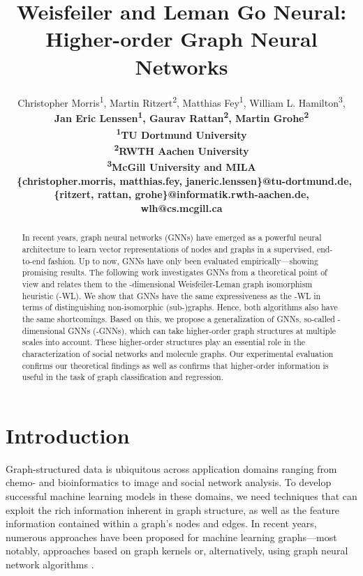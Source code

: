 \documentclass[letterpaper]{article}
\theoremstyle{definition}
\begin{document}
\title{Weisfeiler and Leman Go Neural: Higher-order Graph Neural Networks}
\author{
	Christopher Morris\textsuperscript{1},
	Martin Ritzert\textsuperscript{2},
	Matthias Fey\textsuperscript{1},
	William L. Hamilton\textsuperscript{3},\\\bf \Large
	Jan Eric Lenssen\textsuperscript{1},
	Gaurav Rattan\textsuperscript{2},
	Martin Grohe\textsuperscript{2}\\
	\textsuperscript{1}{TU Dortmund University}\\
	\textsuperscript{2}{RWTH Aachen University}\\
	\textsuperscript{3}{McGill University and MILA}\\\
	\{christopher.morris, matthias.fey, janeric.lenssen\}@tu-dortmund.de,\\
	\{ritzert, rattan, grohe\}@informatik.rwth-aachen.de,\\
	wlh@cs.mcgill.ca
}

\maketitle 

\begin{abstract}
	In recent years, graph neural networks (GNNs) have emerged as a powerful neural architecture to learn vector representations of nodes and graphs in a supervised, end-to-end fashion. Up to now, GNNs have only been evaluated empirically---showing promising results. The following work investigates GNNs from a theoretical point of view and relates them to the -dimensional Weisfeiler-Leman graph isomorphism heuristic (-WL). We show that GNNs have the same expressiveness as the -WL in terms of distinguishing non-isomorphic (sub-)graphs. Hence, both algorithms also have the same shortcomings. Based on this, we propose a generalization of GNNs, so-called -dimensional GNNs (-GNNs), which can take higher-order graph structures at multiple scales into account. These higher-order structures play an essential role in the characterization of social networks and molecule graphs. Our experimental evaluation confirms our theoretical findings as well as confirms that higher-order information is useful in the task of graph classification and regression.
\end{abstract}



\section{Introduction}
Graph-structured data is ubiquitous across application domains ranging from chemo- and bioinformatics to image and social network analysis.
To develop successful machine learning models in these domains, we need techniques that can exploit the rich information inherent in graph structure, as well as the feature information contained within a graph's nodes and edges. In recent years, numerous approaches have been proposed for machine learning graphs---most notably, approaches based on graph kernels \cite{Vis+2010} or, alternatively, using graph neural network algorithms \cite{Ham+2017a}.
\end{document}
